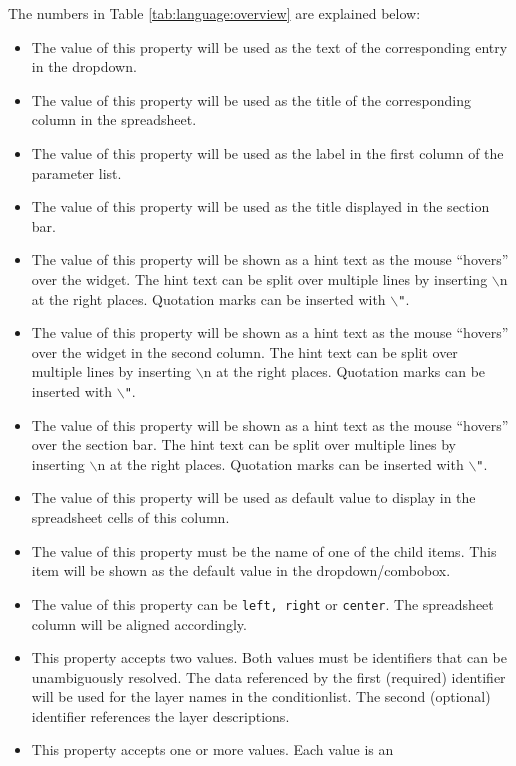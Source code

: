 The numbers in Table \ref{tab:language:overview} are explained below:\small
\begin{itemize}
\item[\R{title1}] The value of this property will be used as the text of the corresponding entry in the dropdown.
\item[\R{title2}] The value of this property will be used as the title of the corresponding column in the spreadsheet.
\item[\R{title3}] The value of this property will be used as the label in the first column of the parameter list.
\item[\R{title4}] The value of this property will be used as the title displayed in the section bar.
\item[\R{hint1}] The value of this property will be shown as a hint text as the mouse ``hovers'' over the widget. The hint text can be split over multiple lines by inserting $\backslash$n at the right
places. Quotation marks can be inserted with
\texttt{$\backslash$"}.
\item[\R{hint2}] The value of this property will be shown as a hint text as the mouse ``hovers'' over the widget in the second column. The hint text can be split over multiple lines by inserting $\backslash$n at the right
places. Quotation marks can be inserted with
\texttt{$\backslash$"}.
\item[\R{hint3}] The value of this property will be shown as a hint text as the mouse ``hovers'' over the section bar. The hint text can be split over multiple lines by inserting $\backslash$n at the right
places. Quotation marks can be inserted with
\texttt{$\backslash$"}.
\item[\R{default1}] The value of this property will be used as default value to display in the spreadsheet cells of this column.
\item[\R{default2}] The value of this property must be the name of one of the
child items. This item will be shown as the default value in the
dropdown/combobox.
\item[\R{align1}] The value of this property can be \texttt{left, right} or \texttt{center}. The spreadsheet column will be aligned accordingly.
\item[\R{adddata1}] This property accepts two values. Both values must be
identifiers that can be unambiguously resolved. The data referenced by the
first (required) identifier will be used for the layer names in the
conditionlist. The second (optional) identifier references the layer
descriptions.
\item[\R{adddata2}] This property accepts one or more values. Each value is an

\end{itemize}

